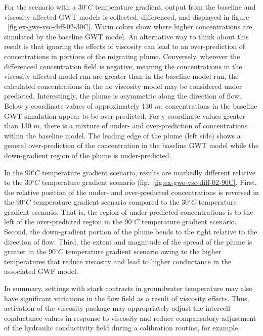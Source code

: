 For the scenario with a 30$^{\circ}C$ temperature gradient, output from the baseline and viscosity-affected GWT models is collected, differenced, and displayed in figure ~\ref{fig:ex-gwe-vsc-diff-02-30C}. Warm colors show where higher concentrations are simulated by the baseline GWT model.  An alternative way to think about this result is that ignoring the effects of viscosity can lead to an over-prediction of concentrations in portions of the migrating plume.  Conversely, wherever the differenced concentration field is negative, meaning the concentrations in the viscosity-affected model run are greater than in the baseline model run, the calculated concentrations in the no viscosity model may be considered under predicted.  Interestingly, the plume is asymmetric along the direction of flow.  Below y coordinate values of approximately 130 $m$, concentrations in the baseline GWT simulation appear to be over-predicted.  For y coordinate values greater than 130 $m$, there is a mixture of under- and over-prediction of concentrations within the baseline model.  The leading edge of the plume (left side) shows a general over-prediction of the concentration in the baseline GWT model while the down-gradient region of the plume is under-predicted.

In the 90$^{\circ}C$ temperature gradient scenario, results are markedly different relative to the 30$^{\circ}C$ temperature gradient scenario (fig.~\ref{fig:ex-gwe-vsc-diff-02-90C}.  First, the relative position of the under- and over-predicted concentrations is reversed in the 90$^{\circ}C$ temperature gradient scenario compared to the 30$^{\circ}C$ temperature gradient scenario.  That is, the region of under-predicted concentrations is to the left of the over-predicted region in the 90$^{\circ}C$ temperature gradient scenario.  Second, the down-gradient portion of the plume bends to the right relative to the direction of flow.  Third, the extent and magnitude of the spread of the plume is greater in the 90$^{\circ}C$ temperature gradient scenario owing to the higher temperatures that reduce viscosity and lead to higher conductance in the associated GWF model.

In summary, settings with stark contrasts in groundwater temperature may also have significant variations in the flow field as a result of viscosity effects.  Thus, activation of the viscosity package may appropriately adjust the intercell conductance values in response to viscosity and reduce compansatory adjustment of the hydraulic conductivity field during a calibration routine, for example.


